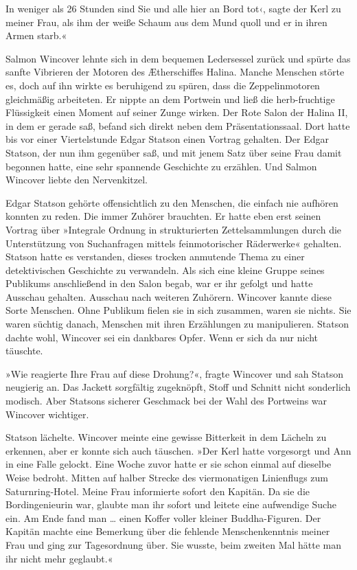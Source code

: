 In weniger als 26 Stunden sind Sie und alle hier an Bord tot‹,
sagte der Kerl zu meiner Frau, als ihm der weiße Schaum aus dem
Mund quoll und er in ihren Armen starb.«

\bigpar

Salmon Wincover lehnte sich in dem bequemen Ledersessel zurück und
spürte das sanfte Vibrieren der Motoren des Ætherschiffes Halina.
Manche Menschen störte es, doch auf ihn wirkte es beruhigend zu
spüren, dass die Zeppelinmotoren gleichmäßig arbeiteten. Er nippte
an dem Portwein und ließ die herb-fruchtige Flüssigkeit einen
Moment auf seiner Zunge wirken. Der Rote Salon der Halina II, in
dem er gerade saß, befand sich direkt neben dem Präsentationssaal.
Dort hatte bis vor einer Viertelstunde Edgar Statson einen Vortrag
gehalten. Der Edgar Statson, der nun ihm gegenüber saß, und mit
jenem Satz über seine Frau damit begonnen hatte, eine sehr
spannende Geschichte zu erzählen. Und Salmon Wincover liebte den
Nervenkitzel.

Edgar Statson gehörte offensichtlich zu den Menschen, die einfach
nie aufhören konnten zu reden. Die immer Zuhörer brauchten. Er
hatte eben erst seinen Vortrag über »Integrale Ordnung in
strukturierten Zettelsammlungen durch die Unterstützung von
Suchanfragen mittels feinmotorischer Räderwerke« gehalten. Statson
hatte es verstanden, dieses trocken anmutende Thema zu einer
detektivischen Geschichte zu verwandeln. Als sich eine kleine
Gruppe seines Publikums anschließend in den Salon begab, war er ihr
gefolgt und hatte Ausschau gehalten. Ausschau nach weiteren
Zuhörern. Wincover kannte diese Sorte Menschen. Ohne Publikum
fielen sie in sich zusammen, waren sie nichts. Sie waren süchtig
danach, Menschen mit ihren Erzählungen zu manipulieren. Statson
dachte wohl, Wincover sei ein dankbares Opfer. Wenn er sich da nur
nicht täuschte.

»Wie reagierte Ihre Frau auf diese Drohung?«, fragte Wincover und
sah Statson neugierig an. Das Jackett sorgfältig zugeknöpft, Stoff
und Schnitt nicht sonderlich modisch. Aber Statsons sicherer
Geschmack bei der Wahl des Portweins war Wincover wichtiger.

Statson lächelte. Wincover meinte eine gewisse Bitterkeit in dem
Lächeln zu erkennen, aber er konnte sich auch täuschen. »Der Kerl
hatte vorgesorgt und Ann in eine Falle gelockt. Eine Woche zuvor
hatte er sie schon einmal auf dieselbe Weise bedroht. Mitten auf
halber Strecke des viermonatigen Linienflugs zum Saturnring-Hotel.
Meine Frau informierte sofort den Kapitän. Da sie die
Bordingenieurin war, glaubte man ihr sofort und leitete eine
aufwendige Suche ein. Am Ende fand man \ldots{} einen Koffer voller
kleiner Buddha-Figuren. Der Kapitän machte eine Bemerkung über die
fehlende Menschenkenntnis meiner Frau und ging zur Tagesordnung
über. Sie wusste, beim zweiten Mal hätte man ihr nicht mehr
geglaubt.«

